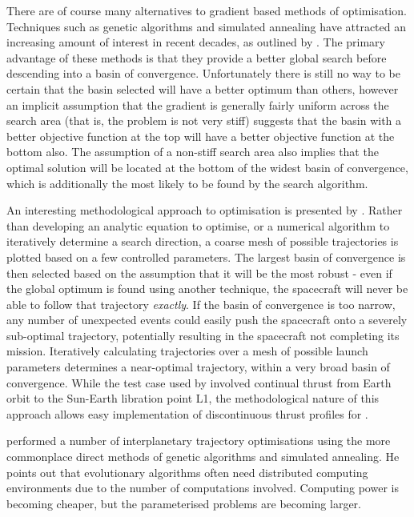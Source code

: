 There are of course many alternatives to gradient based methods of optimisation. Techniques such as genetic algorithms and simulated annealing have attracted an increasing amount of interest in recent decades, as outlined by \textcite{Ren2007}. The primary advantage of these methods is that they provide a better global search before descending into a basin of convergence. Unfortunately there is still no way to be certain that the basin selected will have a better optimum than others, however an implicit assumption that the gradient is generally fairly uniform across the search area (that is, the problem is not very stiff) suggests that the basin with a better objective function at the top will have a better objective function at the bottom also. The assumption of a non-stiff search area also implies that the optimal solution will be located at the bottom of the widest basin of convergence, which is additionally the most likely to be found by the search algorithm.

An interesting methodological approach to optimisation is presented by \textcite{Jackson2008}. Rather than developing an analytic equation to optimise, or a numerical algorithm to iteratively determine a search direction, a coarse mesh of possible trajectories is plotted based on a few controlled parameters. The largest basin of convergence is then selected based on the assumption that it will be the most robust - even if the global optimum is found using another technique, the spacecraft will never be able to follow that trajectory \emph{exactly}. If the basin of convergence is too narrow, any number of unexpected events could easily push the spacecraft onto a severely sub-optimal trajectory, potentially resulting in the spacecraft not completing its mission. Iteratively calculating trajectories over a mesh of possible launch parameters determines a near-optimal trajectory, within a very broad basin of convergence. While the test case used by \textcite{Jackson2008} involved continual thrust from Earth orbit to the Sun-Earth libration point L1, the methodological nature of this approach allows easy implementation of discontinuous thrust profiles for \BW.%

\textcite{Lee2005} performed a number of interplanetary trajectory optimisations using the more commonplace direct methods of genetic algorithms and simulated annealing. He points out that evolutionary algorithms often need distributed computing environments due to the number of computations involved. Computing power is becoming cheaper, but the parameterised problems are becoming larger. 

